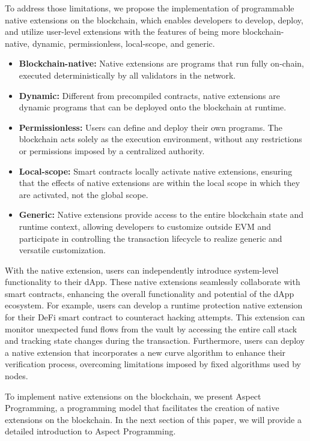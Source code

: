 To address those limitations, we propose the implementation of programmable native extensions on the blockchain, which enables developers to develop, deploy, and utilize user-level extensions with the features of being more blockchain-native, dynamic, permissionless, local-scope, and generic.

\begin{itemize}
    \item \textbf{Blockchain-native:} Native extensions are programs that run fully on-chain, executed deterministically by all validators in the network.
    \item \textbf{Dynamic:} Different from precompiled contracts, native extensions are dynamic programs that can be deployed onto the blockchain at runtime.
    \item \textbf{Permissionless:} Users can define and deploy their own programs. The blockchain acts solely as the execution environment, without any restrictions or permissions imposed by a centralized authority.
    \item \textbf{Local-scope:} Smart contracts locally activate native extensions, ensuring that the effects of native extensions are within the local scope in which they are activated, not the global scope.
    \item \textbf{Generic:} Native extensions provide access to the entire blockchain state and runtime context, allowing developers to customize outside EVM and participate in controlling the transaction lifecycle to realize generic and versatile customization.
\end{itemize}

With the native extension, users can independently introduce system-level functionality to their dApp. These native extensions seamlessly collaborate with smart contracts, enhancing the overall functionality and potential of the dApp ecosystem. For example, users can develop a runtime protection native extension for their DeFi smart contract to counteract hacking attempts. This extension can monitor unexpected fund flows from the vault by accessing the entire call stack and tracking state changes during the transaction. Furthermore, users can deploy a native extension that incorporates a new curve algorithm to enhance their verification process, overcoming limitations imposed by fixed algorithms used by nodes.

To implement native extensions on the blockchain, we present Aspect Programming, a programming model that facilitates the creation of native extensions on the blockchain. In the next section of this paper, we will provide a detailed introduction to Aspect Programming.

